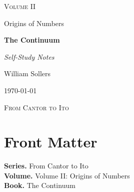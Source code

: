 \documentclass[12pt, a4paper]{report}
\begin{document}
\ExplSyntaxOff
\renewcommand{\familydefault}{\rmdefault}

\begin{titlepage}
\centering
\vspace*{3.5cm}

{\Large\scshape Volume II\par}
\vspace{0.35cm}
{\large Origins of Numbers\par}

\vspace{1.4cm}

{\Huge\bfseries The Continuum\par}

\vspace{0.6cm}
{\large\itshape Self-Study Notes\par}

\vfill

{\large William Sollers\par}
\vspace{0.35cm}
{\large \today\par}

\vfill

{\large\scshape From Cantor to Ito\par}
\end{titlepage}

\clearpage
\thispagestyle{plain}
\chapter*{Front Matter}
\noindent\textbf{Series.} From Cantor to Ito\\[0.5em]
\textbf{Volume.} Volume II: Origins of Numbers\\[0.5em]
\textbf{Book.} The Continuum

\clearpage
\tableofcontents
\clearpage
{}



\clearpage



\printindex[tech]
\printindex[dep]
\end{document}
